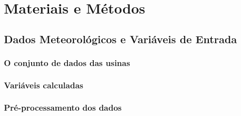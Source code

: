 \chapter{Materiais e Métodos}
\label{cap:materiais_metodos}


\section{Dados Meteorológicos e Variáveis de Entrada}
\label{sec:dados}

\subsection{O conjunto de dados das usinas}
\label{subsec:dataset_usinas}


\subsection{Variáveis calculadas}
\label{subsec:variaveis_calculadas}


\subsection{Pré-processamento dos dados}
\label{subsec:preprocessamento}


